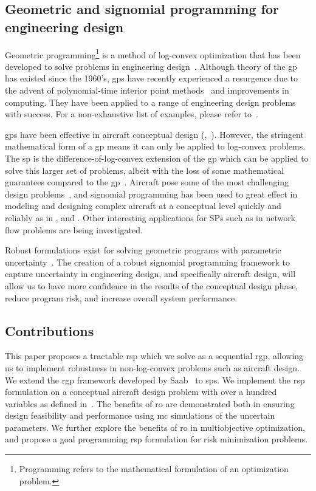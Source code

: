\subsection{Geometric and signomial programming for engineering design}

Geometric programming\footnote{Programming refers to the mathematical formulation of an optimization problem.}
is a method of log-convex optimization that has been developed
to solve problems in engineering design~\cite{Duffin1967}. Although theory of the \gls{gp} has existed since
the 1960's, \gls{gp}s have recently experienced a resurgence due to the advent of polynomial-time
interior point methods~\cite{Nesterov1994} and improvements in computing. They have been
applied to a range of engineering design problems with success. For a non-exhaustive list of examples,
please refer to~\cite{Boyd2007}.

\gls{gp}s have been effective in aircraft conceptual design
(\cite{Hoburg2013},~\cite{Burton2017}).
However, the stringent mathematical form of a \gls{gp} means it can only be applied to log-convex problems.
The \gls{sp} is the difference-of-log-convex extension of the \gls{gp} which can be applied to
solve this larger set of problems, albeit with the loss of some mathematical guarantees compared to the \gls{gp}~\cite{Kirschen2018}.
Aircraft pose some of the most challenging design problems~\cite{York2018}, and signomial programming
has been used to great effect in modeling and designing complex aircraft at a conceptual level quickly
and reliably as in \cite{York2018}, \cite{Kirschen2018} and \cite{Kirschen2016}.
Other interesting applications for SPs such as in network flow problems are being investigated.

Robust formulations exist for solving geometric programs with parametric uncertainty~\cite{Saab2018}.
The creation of a robust signomial programming framework to capture uncertainty in engineering
design, and specifically aircraft design, will allow us to have more confidence in the results
of the conceptual design phase, reduce program risk, and increase overall system performance.

\subsection{Contributions}

This paper proposes a tractable \gls{rsp} which we solve as a sequential \gls{rgp},
allowing us to implement robustness in non-log-convex problems such as aircraft design.
We extend the \gls{rgp} framework developed by Saab~\cite{Saab2018} to \gls{sp}s.
We implement the \gls{rsp} formulation on a conceptual aircraft design problem with over a hundred
variables as defined in~\cite{Ozturk2018}.
The benefits of \gls{ro} are demonstrated both in ensuring design feasibility and performance
using \gls{mc} simulations of the uncertain parameters.
We further explore the benefits of \gls{ro} in multiobjective optimization, and propose
a goal programming \gls{rsp} formulation for risk minimization problems.


